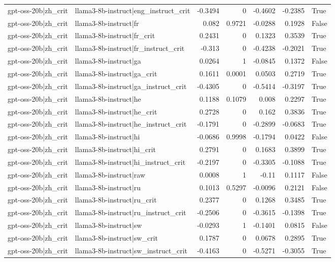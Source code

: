\begin{table}
\begin{tabular}{l l r r r r l}
gpt-oss-20b|zh_crit & llama3-8b-instruct|eng_instruct_crit & -0.3494 & 0 & -0.4602 & -0.2385 & True \\
gpt-oss-20b|zh_crit & llama3-8b-instruct|fr & 0.082 & 0.9721 & -0.0288 & 0.1928 & False \\
gpt-oss-20b|zh_crit & llama3-8b-instruct|fr_crit & 0.2431 & 0 & 0.1323 & 0.3539 & True \\
gpt-oss-20b|zh_crit & llama3-8b-instruct|fr_instruct_crit & -0.313 & 0 & -0.4238 & -0.2021 & True \\
gpt-oss-20b|zh_crit & llama3-8b-instruct|ga & 0.0264 & 1 & -0.0845 & 0.1372 & False \\
gpt-oss-20b|zh_crit & llama3-8b-instruct|ga_crit & 0.1611 & 0.0001 & 0.0503 & 0.2719 & True \\
gpt-oss-20b|zh_crit & llama3-8b-instruct|ga_instruct_crit & -0.4305 & 0 & -0.5414 & -0.3197 & True \\
gpt-oss-20b|zh_crit & llama3-8b-instruct|he & 0.1188 & 0.1079 & 0.008 & 0.2297 & True \\
gpt-oss-20b|zh_crit & llama3-8b-instruct|he_crit & 0.2728 & 0 & 0.162 & 0.3836 & True \\
gpt-oss-20b|zh_crit & llama3-8b-instruct|he_instruct_crit & -0.1791 & 0 & -0.2899 & -0.0683 & True \\
gpt-oss-20b|zh_crit & llama3-8b-instruct|hi & -0.0686 & 0.9998 & -0.1794 & 0.0422 & False \\
gpt-oss-20b|zh_crit & llama3-8b-instruct|hi_crit & 0.2791 & 0 & 0.1683 & 0.3899 & True \\
gpt-oss-20b|zh_crit & llama3-8b-instruct|hi_instruct_crit & -0.2197 & 0 & -0.3305 & -0.1088 & True \\
gpt-oss-20b|zh_crit & llama3-8b-instruct|raw & 0.0008 & 1 & -0.11 & 0.1117 & False \\
gpt-oss-20b|zh_crit & llama3-8b-instruct|ru & 0.1013 & 0.5297 & -0.0096 & 0.2121 & False \\
gpt-oss-20b|zh_crit & llama3-8b-instruct|ru_crit & 0.2377 & 0 & 0.1268 & 0.3485 & True \\
gpt-oss-20b|zh_crit & llama3-8b-instruct|ru_instruct_crit & -0.2506 & 0 & -0.3615 & -0.1398 & True \\
gpt-oss-20b|zh_crit & llama3-8b-instruct|sw & -0.0293 & 1 & -0.1401 & 0.0815 & False \\
gpt-oss-20b|zh_crit & llama3-8b-instruct|sw_crit & 0.1787 & 0 & 0.0678 & 0.2895 & True \\
gpt-oss-20b|zh_crit & llama3-8b-instruct|sw_instruct_crit & -0.4163 & 0 & -0.5271 & -0.3055 & True \\

\end{tabular}
\end{table}
